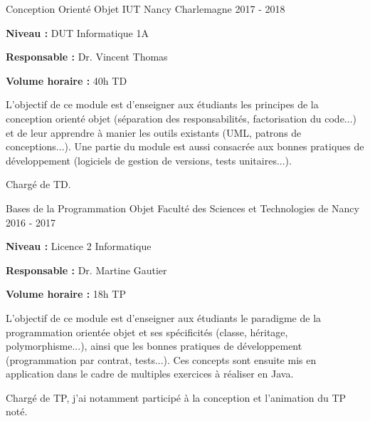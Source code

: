 \documentclass[12pt, a4paper]{awesome-cv}
\begin{document}
\begin{cventries}
  \cventry
  {Conception Orienté Objet} %
  {IUT Nancy Charlemagne} %
  {} %
  {2017 - 2018} %
  {
    \begin{cvitems}
      \item {\textbf{Niveau : } DUT Informatique 1A}
      \item {\textbf{Responsable : } Dr. Vincent Thomas}
      \item {\textbf{Volume horaire : } 40h TD}
    \end{cvitems}
  }

  \begin{cvparagraph}
    L'objectif de ce module est d'enseigner aux étudiants les principes de la conception orienté objet (séparation des responsabilités, factorisation du code...) et de leur apprendre à manier les outils existants (UML, patrons de conceptions...).
    Une partie du module est aussi consacrée aux bonnes pratiques de développement (logiciels de gestion de versions, tests unitaires...).
  \end{cvparagraph}

  \begin{cvparagraph}
    Chargé de TD.
  \end{cvparagraph}

  \cventry
  {Bases de la Programmation Objet} %
  {Faculté des Sciences et Technologies de Nancy} %
  {} %
  {2016 - 2017} %
  {
    \begin{cvitems}
      \item {\textbf{Niveau : } Licence 2 Informatique}
      \item {\textbf{Responsable : } Dr. Martine Gautier}
      \item {\textbf{Volume horaire : } 18h TP}
    \end{cvitems}
  }

  \begin{cvparagraph}
    L'objectif de ce module est d'enseigner aux étudiants le paradigme de la programmation orientée objet et ses spécificités (classe, héritage, polymorphisme...), ainsi que les bonnes pratiques de développement (programmation par contrat, tests...).
    Ces concepts sont ensuite mis en application dans le cadre de multiples exercices à réaliser en Java.
  \end{cvparagraph}

  \begin{cvparagraph}
    Chargé de TP, j'ai notamment participé à la conception et l'animation du TP noté.
  \end{cvparagraph}


\end{cventries}
\end{document}
